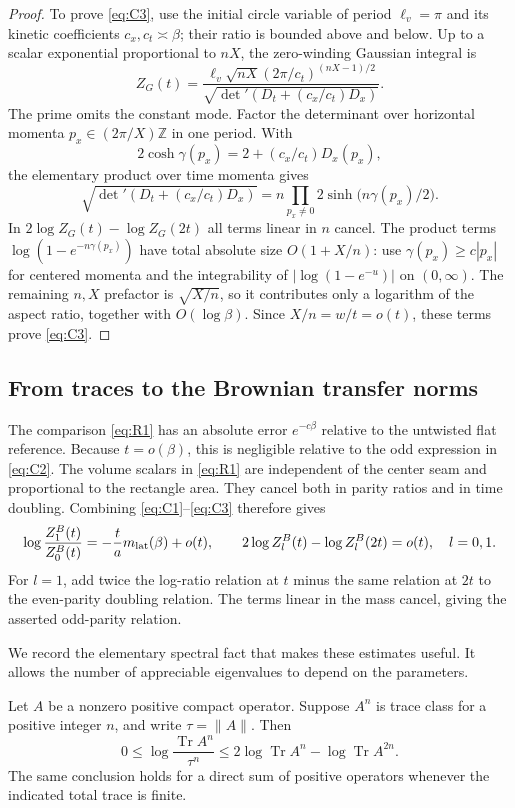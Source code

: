 \begin{proof}
To prove \eqref{eq:C3}, use the initial circle variable of period
$\ell_v=\pi$ and its kinetic coefficients $c_x,c_t\asymp\beta$; their
ratio is bounded above and below. Up to a scalar exponential proportional
to $nX$, the zero-winding Gaussian integral is
\[
 Z_G(t)=
 \frac{\ell_v\sqrt{nX}(2\pi/c_t)^{(nX-1)/2}}
      {\sqrt{\det{}'(D_t+(c_x/c_t)D_x)}}.
\]
The prime omits the constant mode. Factor the determinant over horizontal
momenta $p_x\in(2\pi/X)\mathbb Z$ in one period. With
\[
 2\cosh\gamma(p_x)=2+(c_x/c_t)D_x(p_x),
\]
the elementary product over time momenta gives
\[
 \sqrt{\det{}'(D_t+(c_x/c_t)D_x)}
       =n\prod_{p_x\ne0}2\sinh\bigl(n\gamma(p_x)/2\bigr).
\]
In $2\log Z_G(t)-\log Z_G(2t)$ all terms linear in $n$ cancel.
The product terms $\log(1-e^{-n\gamma(p_x)})$ have total absolute size
$O(1+X/n)$: use $\gamma(p_x)\ge c|p_x|$ for centered momenta and the
integrability of $|\log(1-e^{-u})|$ on $(0,\infty)$. The remaining
$n,X$ prefactor is $\sqrt{X/n}$, so it contributes only a logarithm of
the aspect ratio, together with $O(\log\beta)$. Since $X/n=w/t=o(t)$,
these terms prove \eqref{eq:C3}.
\end{proof}

\subsection{From traces to the Brownian transfer norms}

The comparison \eqref{eq:R1} has an absolute error $e^{-c\beta}$ relative
to the untwisted flat reference. Because $t=o(\beta)$, this is negligible
relative to the odd expression in \eqref{eq:C2}. The volume scalars in
\eqref{eq:R1} are independent of the center seam and proportional to the
rectangle area. They cancel both in parity ratios and in time doubling.
Combining \eqref{eq:C1}--\eqref{eq:C3} therefore gives
\begin{equation}
 \log\frac{Z_1^B(t)}{Z_0^B(t)}
      =-\frac{t}{a}m_{\rm lat}(\beta)+o(t),
 \qquad
 2\log Z_l^B(t)-\log Z_l^B(2t)=o(t),\quad l=0,1.
 \label{eq:C4}
\end{equation}
For $l=1$, add twice the log-ratio relation at $t$ minus the same
relation at $2t$ to the even-parity doubling relation. The terms linear
in the mass cancel, giving the asserted odd-parity relation.

We record the elementary spectral fact that makes these estimates useful.
It allows the number of appreciable eigenvalues to depend on the
parameters.

\begin{lemma}
\label{lem:assembly-trace-norm}
Let $A$ be a nonzero positive compact operator. Suppose $A^n$ is trace
class for a positive integer $n$, and write $\tau=\|A\|$. Then
\[
 0\le\log\frac{\operatorname{Tr}A^n}{\tau^n}
 \le 2\log\operatorname{Tr}A^n-\log\operatorname{Tr}A^{2n}.
\]
The same conclusion holds for a direct sum of positive operators whenever
the indicated total trace is finite.
\end{lemma}

